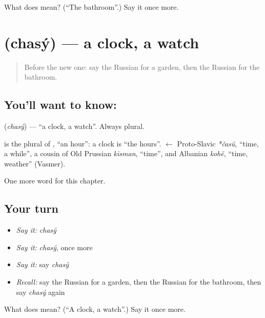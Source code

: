 \begin{tcolorbox}[breakable,colback=teal!4,colframe=teal!35!black,title={Before you move on}]
What does  mean? (\textquotedblleft{}The bathroom\textquotedblright{}.) Say it once more.
\end{tcolorbox}
\section[\texorpdfstring{\ru{часы} (chasý)}{часы (chasý)}]{ (chasý) — a clock, a watch}

\label{lesson:RU-C50-clock}



\begin{quote}
Before the new one: say the Russian for a garden, then the Russian for the bathroom.
\end{quote}

\subsection*{You'll want to know: }
\textbf{} (\emph{chasý}) — \textquotedblleft{}a clock, a watch\textquotedblright{}. Always plural.

\begin{cousinweb}
\textbf{} is the plural of \emph{}, \textquotedblleft{}an hour\textquotedblright{}: a clock is \textquotedblleft{}the hours\textquotedblright{}. \emph{} $\leftarrow$ Proto-Slavic \emph{*časŭ}, \textquotedblleft{}time, a while\textquotedblright{}, a cousin of Old Prussian \emph{kīsman}, \textquotedblleft{}time\textquotedblright{}, and Albanian \emph{kohë}, \textquotedblleft{}time, weather\textquotedblright{} (Vasmer).
\end{cousinweb}

\begin{grammarlens}[title={What you've built}]
One more word for this chapter.
\end{grammarlens}

\subsection*{Your turn}
\begin{itemize}
\raggedright
  \item \emph{Say it:} \emph{chasý}
  \item \emph{Say it:} \emph{chasý}, once more
  \item \emph{Say it:} say \emph{chasý}
  \item \emph{Recall:} say the Russian for a garden, then the Russian for the bathroom, then say \emph{chasý} again
\end{itemize}

\begin{tcolorbox}[breakable,colback=teal!4,colframe=teal!35!black,title={Before you move on}]
What does  mean? (\textquotedblleft{}A clock, a watch\textquotedblright{}.) Say it once more.
\end{tcolorbox}
